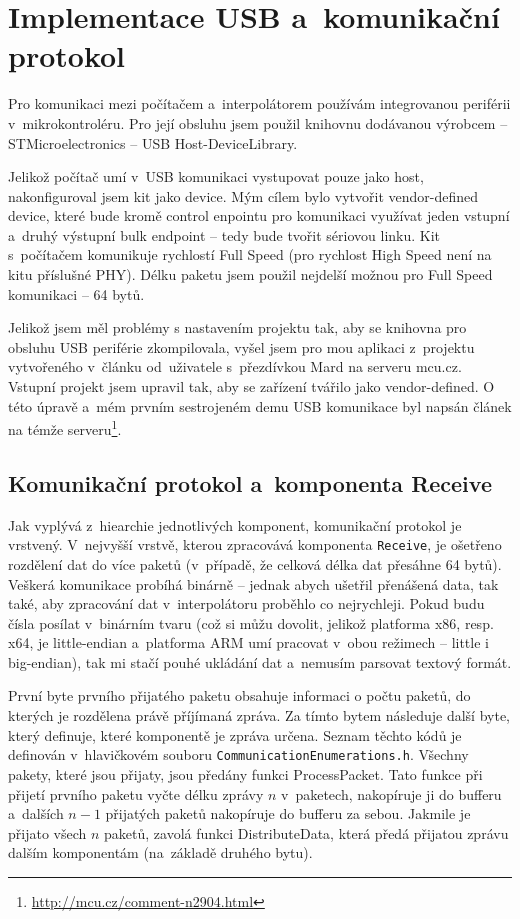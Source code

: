 	\section{Implementace USB a~komunikační protokol}
	Pro komunikaci mezi počítačem a~interpolátorem  používám integrovanou periférii v~mikrokontroléru. Pro její obsluhu jsem použil knihovnu dodávanou výrobcem -- STMicroelectronics -- USB Host-DeviceLibrary.
	
	Jelikož počítač umí v~USB komunikaci vystupovat pouze jako host, nakonfiguroval jsem kit jako device. Mým cílem bylo vytvořit vendor-defined device, které bude kromě control enpointu pro komunikaci využívat jeden vstupní a~druhý výstupní bulk endpoint -- tedy bude tvořit sériovou linku. Kit s~počítačem komunikuje rychlostí Full Speed (pro rychlost High Speed není na kitu příslušné PHY). Délku paketu jsem použil nejdelší možnou pro Full Speed komunikaci -- 64 bytů.
	
	Jelikož jsem měl problémy s nastavením projektu tak, aby se knihovna pro obsluhu USB periférie zkompilovala, vyšel jsem pro mou aplikaci z~projektu vytvořeného v~článku \cite{mcu} od~uživatele s~přezdívkou Mard na serveru mcu.cz. Vstupní projekt jsem upravil tak, aby se zařízení tvářilo jako vendor-defined. O této úpravě a~mém prvním sestrojeném demu USB komunikace byl napsán článek na témže serveru\footnote{\url{http://mcu.cz/comment-n2904.html}}.
	
		\subsection{Komunikační protokol a~komponenta Receive}\label{kap:protokol}
		Jak vyplývá z~hiearchie jednotlivých komponent, komunikační protokol je vrstvený. V~nejvyšší vrstvě, kterou zpracovává komponenta {\tt Receive}, je ošetřeno rozdělení dat do více paketů (v~případě, že celková délka dat přesáhne 64 bytů). Veškerá komunikace probíhá binárně -- jednak abych ušetřil přenášená data, tak také, aby zpracování dat v~interpolátoru proběhlo co nejrychleji. Pokud budu čísla posílat v~binárním tvaru (což si můžu dovolit, jelikož platforma x86, resp. x64, je little-endian a~platforma ARM umí pracovat v~obou režimech -- little i big-endian\cite{wiki:end}), tak mi stačí pouhé ukládání dat a~nemusím parsovat textový formát.
		
		První byte prvního přijatého paketu obsahuje informaci o počtu paketů, do kterých je rozdělena právě příjímaná zpráva. Za tímto bytem následuje další byte, který definuje, které komponentě je zpráva určena. Seznam těchto kódů je definován v~hlavičkovém souboru {\tt CommunicationEnumerations.h}. Všechny pakety, které jsou přijaty, jsou předány funkci ProcessPacket. Tato funkce při přijetí prvního paketu vyčte délku zprávy $n$ v~paketech, nakopíruje ji do bufferu a~dalších $n-1$ přijatých paketů nakopíruje do bufferu za sebou. Jakmile je přijato všech $n$ paketů, zavolá funkci DistributeData, která předá přijatou zprávu dalším komponentám (na~základě druhého bytu).
		
